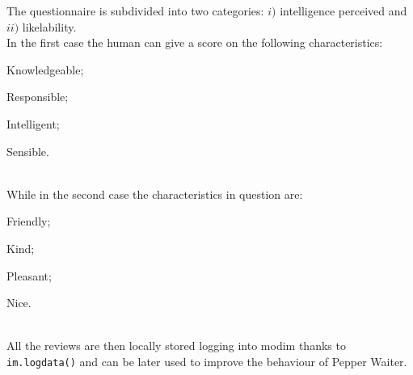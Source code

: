 \documentclass[12pt, letterpaper, twoside]{article}
\begin{document}
The questionnaire is subdivided into two categories: $i)$ intelligence perceived and $ii)$ likelability.\\
In the first case the human can give a score on the following characteristics:
\begin{enumerate*}
	\item Knowledgeable;
	\item Responsible;
	\item Intelligent;
	\item Sensible.
\end{enumerate*}
\\
While in the second case the characteristics in question are:
\begin{enumerate*}
	\item Friendly;
	\item Kind;
	\item Pleasant;
	\item Nice.
\end{enumerate*}
\\
All the reviews are then locally stored logging into modim thanks to \verb|im.logdata()| and can be later used to improve the behaviour of Pepper Waiter.
\end{document}
